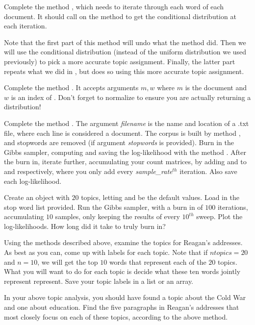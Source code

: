 Complete the method , which needs to iterate through each word of each document. It should call on the method  to get the conditional distribution at each iteration.

Note that the first part of this method will undo what the  method did.  Then we will use the conditional distribution (instead of the uniform distribution we used previously) to pick a more accurate topic assignment.  Finally, the latter part repeats what we did in , but does so using this more accurate topic assignment. 

Complete the method . It accepts arguments $m,w$ where $m$ is the document and $w$ is an index of . Don't forget to normalize to ensure you are actually returning a distribution!

Complete the method . The argument \emph{filename} is the name and location of a .txt file, where each line is considered a document. The corpus is built by method , and stopwords are removed (if argument \emph{stopwords} is provided). Burn in the Gibbs sampler, computing and saving the log-likelihood with the method . After the burn in, iterate further, accumulating your count matrices, by adding  and  to  and  respectively, where you only add every \emph{sample\_rate}$^{th}$ iteration. Also save each log-likelihood.

Create an  object with $20$ topics, letting  and  be the default values. Load in the stop word list provided. Run the Gibbs sampler, with a burn in of $100$ iterations, accumulating $10$ samples, only keeping the results of every $10^{th}$ sweep. Plot the log-likelihoods. How long did it take to truly burn in?

Using the methods described above, examine the topics for Reagan's addresses. As best as you can, come up with labels for each topic.  Note that if $ntopics=20$ and $n=10$, we will get the top $10$ words that represent each of the $20$ topics.  What you will want to do for each topic is decide what these ten words jointly represent represent.  Save your topic labels in a list or an array.

In your above topic analysis, you should have found a topic about the Cold War and one about education. Find the five paragraphs in Reagan's addresses that most closely focus on each of these topics, according to the above method.
